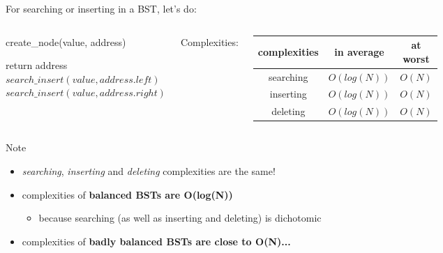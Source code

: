 \documentclass{beamer}[10pt, usepdftitle=false, handout]
\begin{document}
	\begin{frame}
	
	For searching or inserting in a BST, let's do:
	
	\vspace*{1em}	
	
	\begin{columns}[c]
	\begin{center}
	 {
	\begin{algorithm}[H]
    \SetAlgoLined   
	 {
		 {
			create\_node(value, address)\;
		} {
			 {
				return address\;
			} {
				 {
					$search\_insert(value, address.left)$
				} {
					$search\_insert(value, address.right)$
				}
			}
		
		}		
	}    

    \end{algorithm}
    }
    \end{center}

	Complexities:

	
	\begin{flushleft}
	\scalebox{0.6} {
	\begin{tabular}{c|c|c}
	\textbf{complexities} & \textbf{in average} & \textbf{at worst} \\ \hline
	searching & $O(log(N))$ & $O(N)$ \\ \hline
	inserting & $O(log(N))$ & $O(N)$ \\ \hline
	deleting & $O(log(N))$ & $O(N)$
	\end{tabular}	
	}
	\end{flushleft}	
	
	\end{columns}	
	
	\pause
	
	\begin{block}{Note}
	\begin{itemize}
	\item {\textit{searching}, \textit{inserting} and \textit{deleting} complexities are the same!}
	\item {complexities of \textbf{balanced BSTs are O(log(N))}
		\begin{itemize}
			\item {because searching (as well as inserting and deleting) is dichotomic}
		\end{itemize}			
	}
	\item {complexities of \textbf{badly balanced BSTs are close to O(N)...}}	
	\end{itemize}		
	\end{block}	
	
	\end{frame}		
	
\end{document}
